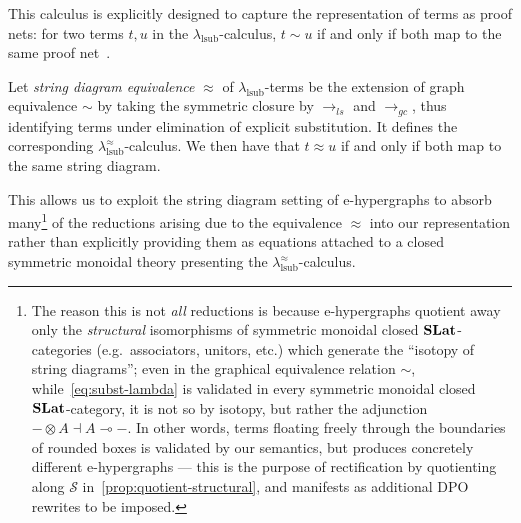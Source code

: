 This calculus is explicitly designed to capture the representation of terms as proof nets: for two terms $t, u$ in the $\lambda_{\text{lsub}}$-calculus, $t \sim u$ if and only if both map to the same proof net~\cite{accattoliJumpingBoxGraphical2011}.
\begin{prop}{\cite[§ 5.1.1]{ghica2024stringdiagramslambdacalculifunctional}}
	Let \emph{string diagram equivalence} $\approx$ of $\lambda_{\text{lsub}}$-terms be the extension of graph equivalence $\sim$ by taking the symmetric closure by $\to_{ls}$ and $\to_{gc}$, thus identifying terms under elimination of explicit substitution.
	It defines the corresponding $\lambda^\approx_{\text{lsub}}$-calculus.
	We then have that $t \approx u$ if and only if both map to the same string diagram.
\end{prop}
This allows us to exploit the string diagram setting of e-hypergraphs to absorb many\footnote{The reason this is not \emph{all} reductions is because e-hypergraphs quotient away only the \emph{structural} isomorphisms of symmetric monoidal closed $\mathbf{SLat}$-categories (e.g.\ associators, unitors, etc.) which generate the \enquote{isotopy of string diagrams}; even in the graphical equivalence relation $\sim$, while~\autoref{eq:subst-lambda} is validated in every symmetric monoidal closed $\mathbf{SLat}$-category, it is not so by isotopy, but rather the adjunction $ - \otimes A \dashv A \multimap -$. In other words, terms floating freely through the boundaries of rounded boxes is validated by our semantics, but produces concretely different e-hypergraphs --- this is the purpose of rectification by quotienting along $\mathcal{S}$ in~\autoref{prop:quotient-structural}, and manifests as additional DPO rewrites to be imposed.} of the reductions arising due to the equivalence $\approx$ into our representation rather than explicitly providing them as equations attached to a closed symmetric monoidal theory presenting the $\lambda^\approx_{\text{lsub}}$-calculus.

